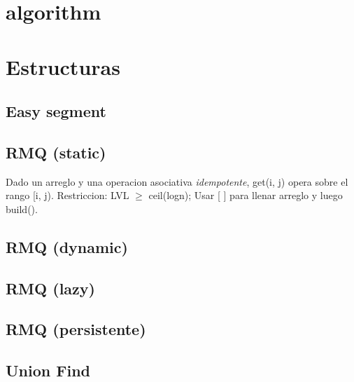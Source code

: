

\def\title{TicoBits - Universidad de Costa Rica}
\tableofcontents\newpage
 
\section{algorithm}%



\section{Estructuras}%
\subsection{Easy segment}
\subsection{RMQ (static)}
Dado un arreglo y una operacion asociativa \emph{idempotente}, get(i, j) opera sobre el rango [i, j). Restriccion: LVL $\ge$ ceil(logn); Usar [ ] para llenar arreglo y luego build().
\subsection{RMQ (dynamic)}
\subsection{RMQ (lazy)}
\subsection{RMQ (persistente)}
\subsection{Union Find}

